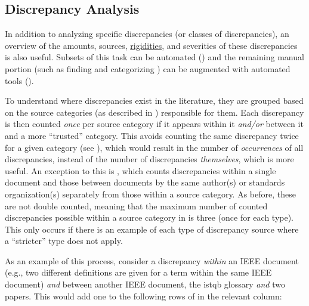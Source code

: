 \graphGenDesc{}

\subsection{Discrepancy Analysis}
\label{discrep-analysis}

In addition to analyzing specific discrepancies (or classes of discrepancies),
an overview of the amounts, sources, \hyperref[rigidity]{rigidities}, and
severities of these discrepancies is also
useful. Subsets of this task can be automated ()
and the remaining manual portion (such as finding and categorizing
) can be augmented with automated
tools ().

To understand where discrepancies exist in the literature, they are
grouped based on the source categories (as described in )
responsible for them. Each discrepancy is then counted \emph{once} per source
category if it appears within it \emph{and/or} between it and a more
``trusted'' category.
This avoids counting the same discrepancy twice for a given category (see
), which would result in the number of
\emph{occurrences} of all discrepancies, instead of the number of discrepancies
\emph{themselves}, which is more useful. An exception to this is
, which counts discrepancies within a single document
and those between documents by the same author(s) or standards organization(s)
separately from those within a source category. As before, these are not double
counted, meaning that the maximum number of counted discrepancies possible
within a source category in  is three (once for each
type). This only occurs if there is an example of each type of discrepancy
source where a ``stricter'' type does not apply.

\label{discrep-analysis-example}
As an example of this process, consider a discrepancy \emph{within} an IEEE
document (e.g., two different definitions are given for a term within the same
IEEE document) \emph{and} between another IEEE document, the \acs{istqb}
glossary \emph{and} two papers. This would add one to the
following rows of  in the relevant column:

